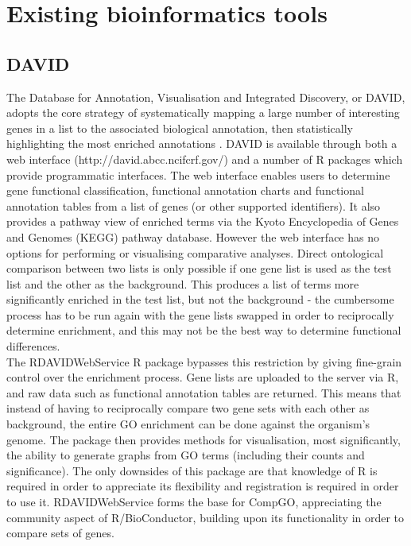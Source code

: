 \documentclass[11pt, oneside]{article}
\begin{document}
\section*{Existing bioinformatics tools}
\subsection*{DAVID}

The Database for Annotation, Visualisation and Integrated Discovery, or DAVID, adopts the core strategy of systematically mapping a large number of interesting genes in a list to the associated biological annotation, then statistically highlighting the most enriched annotations \cite{David08}. %
DAVID is available through both a web interface (http://david.abcc.ncifcrf.gov/) and a number of R packages which provide programmatic interfaces. The web interface enables users to determine gene functional classification, functional annotation charts and functional annotation tables from a list of genes (or other supported identifiers). It also provides a pathway view of enriched terms via the Kyoto Encyclopedia of Genes and Genomes (KEGG) pathway database. However the web interface has no options for performing or visualising comparative analyses. Direct ontological comparison between two lists is only possible if one gene list is used as the test list and the other as the background. This produces a list of terms more significantly enriched in the test list, but not the background -  the cumbersome process has to be run again with the gene lists swapped in order to reciprocally determine enrichment, and this may not be the best way to determine functional differences.\\

The RDAVIDWebService R package bypasses this restriction by giving fine-grain control over the enrichment process. Gene lists are uploaded to the server via R, and raw data such as functional annotation tables are returned. This means that instead of having to reciprocally compare two gene sets with each other as background, the entire GO enrichment can be done against the organism's genome. The package then provides methods for visualisation, most significantly, the ability to generate graphs from GO terms (including their counts and significance). The only downsides of this package are that knowledge of R is required in order to appreciate its flexibility and registration is required in order to use it. RDAVIDWebService forms the base for CompGO, appreciating the community aspect of R/BioConductor, building upon its functionality in order to compare sets of genes. \\
\end{document}
